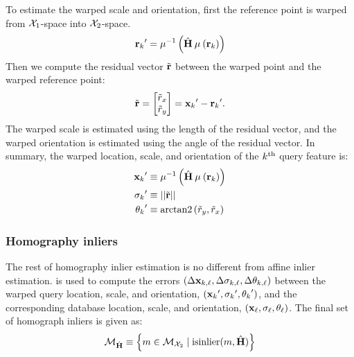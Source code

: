         To estimate the warped scale and orientation, first the reference
          point is warped from $\mathcal{X}_{1}$-space into $\mathcal{X}_{2}$-space.
        \begin{equation}
            {{\ensuremath{\mathbf{r}}_{k}}}' = \mathbin{\mu^{-1}}\left(\hat{\mathbf{H}} \mathbin{\mu}\left({\mathbf{r}_{k}}\right)\right)
        \end{equation}
        Then we compute the residual vector $\tilde{\mathbf{r}}$ between the warped point and the warped reference point:
        \begin{equation}
            \tilde{\mathbf{r}} = \begin{bmatrix} \tilde{r}_x \\ \tilde{r}_y \end{bmatrix} = {{\mathbf{x}_{k}}}'- {{\mathbf{r}_{k}}}'.
        \end{equation}
        The warped scale is estimated using the length of the residual vector, and the warped orientation is
          estimated using the angle of the residual vector.
        In summary, the warped location, scale, and orientation of the $k^{\textrm{th}}{}$ query feature is:
        \begin{equation}\label{eqn:homogwarp}
            \begin{aligned}
                {{\ensuremath{\mathbf{x}}_{k}}}'      &\equiv \mathbin{\mu^{-1}}\left(\hat{\mathbf{H}} \mathbin{\mu}\left({\mathbf{r}_{k}}\right)\right) \\
                 {{\sigma_{k}}}'  &\equiv ||\tilde{\mathbf{r}}||_{}\\
                {{\theta_{k}}}'     &\equiv \mathbin{\operatorname{arctan2}}\left(\tilde{r}_y, \tilde{r}_x\right)
            \end{aligned}
        \end{equation}

        \subsubsection{Homography inliers}
        The rest of homography inlier estimation is no different from affine inlier estimation.
         is used to compute the errors $( %
        \Delta \pt_{\idxI, \idxII}, %
        \Delta \scale_{\idxI, \idxII}, %
        \Delta \ori_{\idxI, \idxII})$
        between the warped query location, scale, and orientation, $({{\mathbf{x}_{k}}}', {{\sigma_{k}}}', {{\theta_{k}}}')$, %
        and the corresponding database location, scale, and orientation, %
        $({{\mathbf{x}_{\ell}}}, {{\sigma_{\ell}}}, {{\theta_{\ell}}})$.
        The final set of homograph inliers is given as:
        \begin{equation}\label{eqn:homoginliers}
            \mathcal{M}_{\hat{\mathbf{H}}} \equiv \left\{m  \in \mathcal{M}_{\mathcal{X}_{2}} \mid \operatorname{isinlier}(m, \hat{\mathbf{H}})\right\}
        \end{equation}


